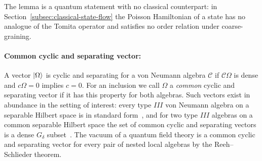 \documentclass[a4paper,11pt]{article}
\theoremstyle{definition}
\newcommand{\mN}{\mathcal{N}}
\newcommand{\mM}{\mathcal{M}}
\begin{document}
The lemma is a quantum statement with no classical counterpart: in Section~\ref{subsec:classical-state-flow} the Poisson Hamiltonian of a state has no analogue of the Tomita operator and satisfies no order relation under coarse-graining.

\paragraph{Common cyclic and separating vector:} A vector $\ket\Omega$ is cyclic and separating for a von Neumann algebra $\mathcal C$
if $\mathcal C\Omega$ is dense and $c\Omega=0$ implies $c=0$. For an inclusion we
call $\Omega$ a \emph{common} cyclic and separating vector if it has this property
for both algebras. Such vectors exist in abundance in the setting of interest:
every type $III$ von Neumann algebra on a separable Hilbert space is in standard
form~\cite{Blackadar2006}, and for two type $III$ algebras on a common separable
Hilbert space the set of common cyclic and separating vectors is a dense $G_\delta$
subset~\cite{dixmiermarechal}. The vacuum of a quantum field theory is a common
cyclic and separating vector for every pair of nested local algebras by the
Reeh--Schlieder theorem.
\end{document}
